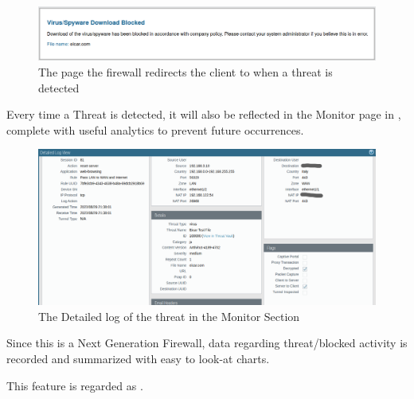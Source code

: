 \begin{figure}[h!]
 \centering
 \includegraphics[width=13.5cm]{img/virus_blocked.png}
 \caption{The page the firewall redirects the client to when a threat is detected}
 \label{fig: virus blocked}
\end{figure}

Every time a Threat is detected, it will also be reflected in the Monitor page in , complete with useful analytics to prevent future occurrences.

\begin{figure}[h!]
 \centering
 \includegraphics[width=13.7cm]{img/detailed_log.png}
 \caption{The Detailed log of the threat in the Monitor Section}
 \label{fig: detailed log}
\end{figure}

\newpage

Since this is a Next Generation Firewall, data regarding threat/blocked activity is recorded and summarized with easy to look-at charts.

This feature is regarded as .

